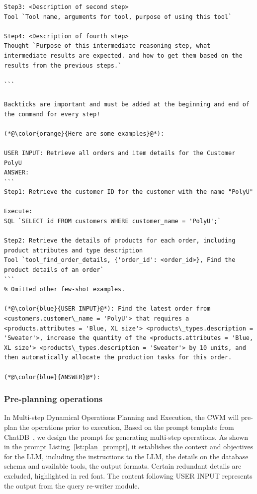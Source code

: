 \documentclass[preprint,12pt]{elsarticle}
\begin{document}
\begin{lstlisting}[style=prompt, label={lst:plan_prompt},caption={Prompt for generating the planned multi-step Operations},aboveskip=0pt, belowskip=0pt]
Step3: <Description of second step>
Tool `Tool name, arguments for tool, purpose of using this tool`

Step4: <Description of fourth step>
Thought `Purpose of this intermediate reasoning step, what intermediate results are expected. and how to get them based on the results from the previous steps.`

```

Backticks are important and must be added at the beginning and end of the command for every step!

(*@\color{orange}{Here are some examples}@*):

USER INPUT: Retrieve all orders and item details for the Customer PolyU
ANSWER:
```
Step1: Retrieve the customer ID for the customer with the name "PolyU"

Execute:
SQL `SELECT id FROM customers WHERE customer_name = 'PolyU';`

Step2: Retrieve the details of products for each order, including product attributes and type description
Tool `tool_find_order_details, {'order_id': <order_id>}, Find the product details of an order`
```
% Omitted other few-shot examples.

(*@\color{blue}{USER INPUT}@*): Find the latest order from <customers.customer\_name = 'PolyU'> that requires a <products.attributes = 'Blue, XL size'> <products\_types.description = 'Sweater'>, increase the quantity of the <products.attributes = 'Blue, XL size'> <products\_types.description = 'Sweater'> by 10 units, and then automatically allocate the production tasks for this order.

(*@\color{blue}{ANSWER}@*): 

\end{lstlisting}

\subsubsection{Pre-planning operations}
In Multi-step Dynamical Operations Planning and Execution, the CWM will pre-plan the operations prior to execution, 
Based on the prompt template from ChatDB~\cite{hu2023chatdb}, we design the prompt for generating multi-step  operations.
As shown in the prompt Listing~\ref{lst:plan_prompt}, it establishes the context and objectives for the LLM, including the instructions to the LLM, the details on the database schema and available tools, the output formats.
Certain redundant details are excluded, highlighted in red font.
The content following USER INPUT represents the output from the query re-writer module.
\end{document}
